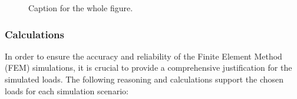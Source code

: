 \begin{figure}[ht]
  \centering
  \caption{Caption for the whole figure.}
  \label{fig:test}
\end{figure}


\subsubsection{Calculations}

In order to ensure the accuracy and reliability of the Finite Element Method (FEM) simulations, it is crucial to provide a comprehensive justification for the simulated loads. The following reasoning and calculations support the chosen loads for each simulation scenario:

